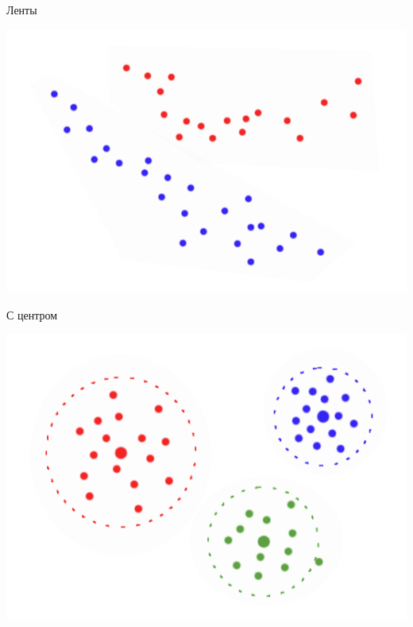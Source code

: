 \documentclass[10pt]{beamer}
\begin{document}
\begin{frame}{Ленты}
	\begin{center}
	  \includegraphics[height=0.8 \textheight, keepaspectratio = true]{images/cluster2}  
	\end{center}
\end{frame}

\begin{frame}{С центром}
	\begin{center}
	  \includegraphics[height=0.8 \textheight, keepaspectratio = true]{images/cluster3}  
	\end{center}
\end{frame}
\end{document}
